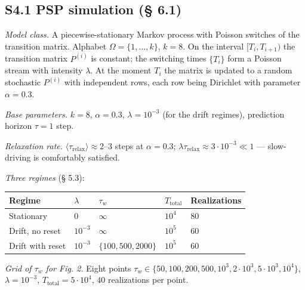 \documentclass[pdflatex,sn-mathphys-ay]{sn-jnl}
\begin{document}
\subsection*{S4.1 PSP simulation (§ 6.1)}\label{s4.1-psp-simulation-6.1}



\emph{Model class.} A piecewise-stationary Markov process with Poisson switches of the transition matrix. Alphabet \(\Omega = \{1, \ldots, k\}\), \(k = 8\). On the interval \([T_i, T_{i+1})\) the transition matrix \(P^{(i)}\) is constant; the switching times \(\{T_i\}\) form a Poisson stream with intensity \(\lambda\). At the moment \(T_i\) the matrix is updated to a random stochastic \(P^{(i)}\) with independent rows, each row being Dirichlet with parameter \(\alpha = 0.3\).



\emph{Base parameters.} \(k = 8\), \(\alpha = 0.3\), \(\lambda = 10^{-3}\) (for the drift regimes), prediction horizon \(\tau = 1\) step.



\emph{Relaxation rate.} \(\langle \tau_{\text{relax}} \rangle \approx 2\)--\(3\) steps at \(\alpha = 0.3\); \(\lambda \tau_{\text{relax}} \approx 3 \cdot 10^{-3} \ll 1\) --- slow-driving is comfortably satisfied.



\emph{Three regimes} (§ 5.3):



\begin{center}\small
\begin{tabular}{@{}lllll@{}}
\toprule

Regime & \(\lambda\) & \(\tau_w\) & \(T_{\text{total}}\) & Realizations \\

\midrule

Stationary & \(0\) & \(\infty\) & \(10^4\) & \(80\) \\

Drift, no reset & \(10^{-3}\) & \(\infty\) & \(10^5\) & \(60\) \\

Drift with reset & \(10^{-3}\) & \(\{100, 500, 2000\}\) & \(10^5\) & \(60\) \\

\bottomrule
\end{tabular}
\end{center}


\emph{Grid of \(\tau_w\) for Fig. 2.} Eight points \(\tau_w \in \{50, 100, 200, 500, 10^3, 2 \cdot 10^3, 5 \cdot 10^3, 10^4\}\), \(\lambda = 10^{-3}\), \(T_{\text{total}} = 5 \cdot 10^4\), \(40\) realizations per point.
\end{document}
